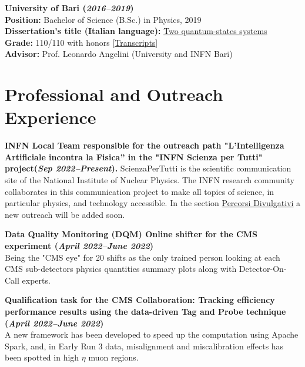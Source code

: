 \documentclass[11pt]{res}
\newcommand{\MarginText}[1]{\section{#1}\vspace{10pt}}
\begin{document}
\begin{resume}
\textbf{University of Bari (\textit{2016--2019})}\\
\textbf{Position:} Bachelor of Science (B.Sc.) in Physics, 2019\\
\textbf{Dissertation's title (Italian language):} 
\href{https://drive.google.com/file/d/1fyNx6B4lviqkeJxsrIEsZ-UJhCTqDaSC/view?usp=share_link}{Two quantum-states systems}\\
\textbf{Grade:} 110/110 with honors [\href{https://drive.google.com/file/d/13qAI0iYuqlVBQinnvZXv1eGDBE0ShnbM/view?usp=sharing}{Transcripts}]\\
\textbf{Advisor:} Prof. Leonardo Angelini (University and INFN Bari)


\MarginText{Professional and Outreach Experience}

\textbf{INFN Local Team responsible for the outreach path "L'Intelligenza Artificiale incontra la Fisica” in the "INFN Scienza per Tutti" project(\textit{Sep 2022--Present}).}
ScienzaPerTutti is the scientific communication site of the National Institute of Nuclear Physics. The INFN research community collaborates in this communication project to make all topics of science, in particular physics, and technology accessible. In the section \href{https://scienzapertutti.infn.it/percorsi-divulgativi}{Percorsi Divulgativi} a new outreach will be added soon.

\textbf{Data Quality Monitoring (DQM) Online shifter for the CMS experiment (\textit{April 2022--June 2022})}\\
Being the "CMS eye" for 20 shifts as the only trained person looking at each CMS sub-detectors physics quantities summary plots along with Detector-On-Call experts.

\textbf{Qualification task for the CMS Collaboration: Tracking efficiency performance results using the data-driven Tag and Probe technique (\textit{April 2022--June 2022})}\\
A new framework has been developed to speed up the computation using Apache Spark, and, in Early Run 3 data, misalignment and miscalibration effects has been spotted in high $\eta$ muon regions.


\end{resume}
\end{document}
